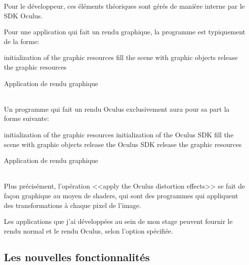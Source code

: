 \documentclass[a4paper,french,12pt]{article}
\begin{document}
			    Pour le développeur, ces éléments théoriques sont gérés de manière interne par le SDK Oculus.
			    
			    Pour une application qui fait un rendu graphique, la programme est typiquement de
			    la forme:\\
			    
			    \begin{algorithm}[H]
			      initialization of the graphic resources\;
			      fill the scene with graphic objects\;
			      release the graphic resources\;
			      \caption{Application de rendu graphique}
			    \end{algorithm} ~\\
			    
			    
			    Un programme qui fait un rendu Oculus exclusivement aura pour sa part la forme suivante:\\
			    
			    \begin{algorithm}[H]
			      initialization of the graphic resources\;
			      initialization of the Oculus SDK\;
			      fill the scene with graphic objects\;
			      release the Oculus SDK\;
			      release the graphic resources\;
			      \caption{Application de rendu graphique}
			    \end{algorithm} ~\\
			    
			    Plus précisément, l'opération <<apply the Oculus distortion effects>> se fait de façon graphique
			    au moyen de shaders, qui sont des programmes qui appliquent des transformations à chaque pixel de l'image.
			    
			    
			    Les applications que j'ai développées au sein de mon stage peuvent fournir le rendu normal 
			    et le rendu Oculus, selon l'option spécifiée.

	\subsection{Les nouvelles fonctionnalités}
	
\end{document}
